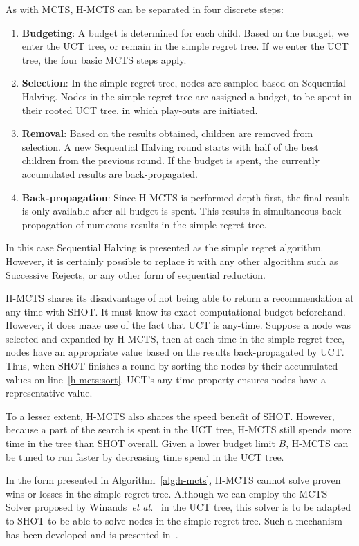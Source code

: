 \documentclass[a4paper]{llncs}
\begin{document}
As with MCTS, H-MCTS can be separated in four discrete steps:
\begin{enumerate}
\item \textbf{Budgeting}: A budget is determined for each child. Based on the budget, we enter the UCT tree, or remain in the simple regret tree. If we enter the UCT tree, the four basic MCTS steps apply.
\item \textbf{Selection}: In the simple regret tree, nodes are sampled based on Sequential Halving. Nodes in the simple regret tree are assigned a budget, to be spent in their rooted UCT tree, in which play-outs are initiated.
\item \textbf{Removal}: Based on the results obtained, children are removed from selection. A new Sequential Halving round starts with half of the best children from the previous round. If the budget is spent, the currently accumulated results are back-propagated.
\item \textbf{Back-propagation}: Since H-MCTS is performed depth-first, the final result is only available after all budget is spent. This results in simultaneous back-propagation of numerous results in the simple regret tree.
\end{enumerate}
In this case Sequential Halving is presented as the simple regret algorithm. However, it is certainly possible to replace it with any other algorithm such as Successive Rejects, or any other form of sequential reduction.

H-MCTS shares its disadvantage of not being able to return a recommendation at any-time with SHOT. It must know its exact computational budget beforehand. However, it does make use of the fact that UCT is any-time. Suppose a node was selected and expanded by H-MCTS, then at each time in the simple regret tree, nodes have an appropriate value based on the results back-propagated by UCT. Thus, when SHOT finishes a round by sorting the nodes by their accumulated values on line~\ref{h-mcts:sort}, UCT's any-time property ensures nodes have a representative value.

To a lesser extent, H-MCTS also shares the speed benefit of SHOT. However, because a part of the search is spent in the UCT tree, H-MCTS still spends more time in the tree than SHOT overall. Given a lower budget limit $B$, H-MCTS can be tuned to run faster by decreasing time spend in the UCT tree.

In the form presented in Algorithm~\ref{alg:h-mcts}, H-MCTS cannot solve proven wins or losses in the simple regret tree. Although we can employ the MCTS-Solver proposed by Winands~\emph{et al.}~\cite{Winands2008} in the UCT tree, this solver is to be adapted to SHOT to be able to solve nodes in the simple regret tree. Such a mechanism has been developed and is presented in~\cite{pepels14novel}.
\end{document}
